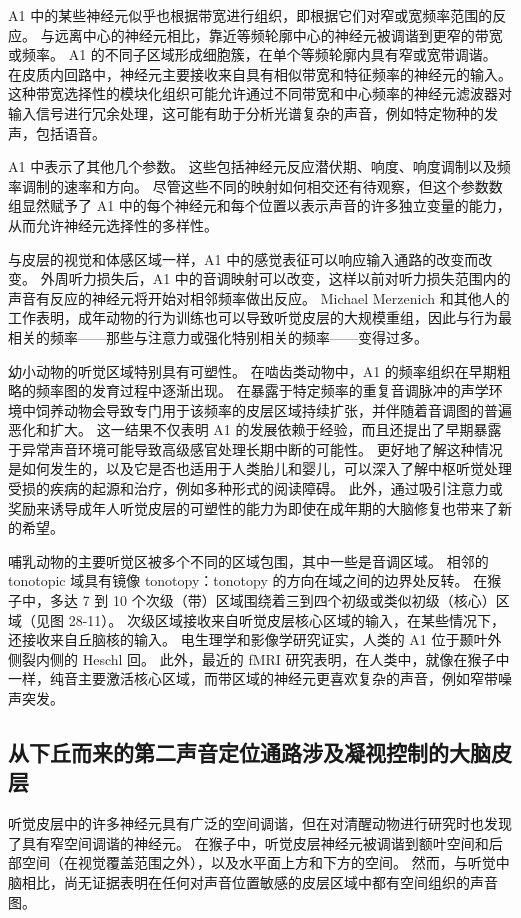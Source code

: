 A1 中的某些神经元似乎也根据带宽进行组织，即根据它们对窄或宽频率范围的反应。 与远离中心的神经元相比，靠近等频轮廓中心的神经元被调谐到更窄的带宽或频率。 A1 的不同子区域形成细胞簇，在单个等频轮廓内具有窄或宽带调谐。 在皮质内回路中，神经元主要接收来自具有相似带宽和特征频率的神经元的输入。 这种带宽选择性的模块化组织可能允许通过不同带宽和中心频率的神经元滤波器对输入信号进行冗余处理，这可能有助于分析光谱复杂的声音，例如特定物种的发声，包括语音。

A1 中表示了其他几个参数。 这些包括神经元反应潜伏期、响度、响度调制以及频率调制的速率和方向。 尽管这些不同的映射如何相交还有待观察，但这个参数数组显然赋予了 A1 中的每个神经元和每个位置以表示声音的许多独立变量的能力，从而允许神经元选择性的多样性。

与皮层的视觉和体感区域一样，A1 中的感觉表征可以响应输入通路的改变而改变。 外周听力损失后，A1 中的音调映射可以改变，这样以前对听力损失范围内的声音有反应的神经元将开始对相邻频率做出反应。 Michael Merzenich 和其他人的工作表明，成年动物的行为训练也可以导致听觉皮层的大规模重组，因此与行为最相关的频率——那些与注意力或强化特别相关的频率——变得过多。

幼小动物的听觉区域特别具有可塑性。 在啮齿类动物中，A1 的频率组织在早期粗略的频率图的发育过程中逐渐出现。 在暴露于特定频率的重复音调脉冲的声学环境中饲养动物会导致专门用于该频率的皮层区域持续扩张，并伴随着音调图的普遍恶化和扩大。 这一结果不仅表明 A1 的发展依赖于经验，而且还提出了早期暴露于异常声音环境可能导致高级感官处理长期中断的可能性。 更好地了解这种情况是如何发生的，以及它是否也适用于人类胎儿和婴儿，可以深入了解中枢听觉处理受损的疾病的起源和治疗，例如多种形式的阅读障碍。 此外，通过吸引注意力或奖励来诱导成年人听觉皮层的可塑性的能力为即使在成年期的大脑修复也带来了新的希望。

哺乳动物的主要听觉区被多个不同的区域包围，其中一些是音调区域。 相邻的 tonotopic 域具有镜像 tonotopy：tonotopy 的方向在域之间的边界处反转。 在猴子中，多达 7 到 10 个次级（带）区域围绕着三到四个初级或类似初级（核心）区域（见图 28-11）。 次级区域接收来自听觉皮层核心区域的输入，在某些情况下，还接收来自丘脑核的输入。 电生理学和影像学研究证实，人类的 A1 位于颞叶外侧裂内侧的 Heschl 回。 此外，最近的 fMRI 研究表明，在人类中，就像在猴子中一样，纯音主要激活核心区域，而带区域的神经元更喜欢复杂的声音，例如窄带噪声突发。


\subsection{从下丘而来的第二声音定位通路涉及凝视控制的大脑皮层}
听觉皮层中的许多神经元具有广泛的空间调谐，但在对清醒动物进行研究时也发现了具有窄空间调谐的神经元。 在猴子中，听觉皮层神经元被调谐到额叶空间和后部空间（在视觉覆盖范围之外），以及水平面上方和下方的空间。 然而，与听觉中脑相比，尚无证据表明在任何对声音位置敏感的皮层区域中都有空间组织的声音图。

